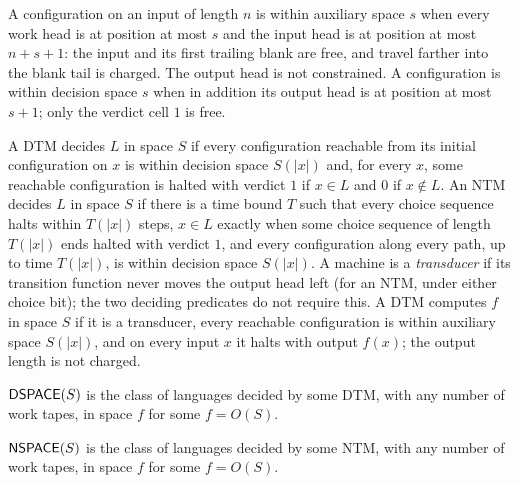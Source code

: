\begin{definition}
  \label{def:space-decides-in-space}
  \leanok
  A configuration on an input of length $n$ is within auxiliary space $s$ when
  every work head is at position at most $s$ and the input head is at position
  at most $n + s + 1$: the input and its first trailing blank are free, and
  travel farther into the blank tail is charged. The output head is not
  constrained. A configuration is within decision space $s$ when in addition
  its output head is at position at most $s + 1$; only the verdict cell $1$ is
  free.

  A DTM decides $L$ in space $S$ if every configuration reachable from its
  initial configuration on $x$ is within decision space $S(|x|)$ and, for every
  $x$, some reachable configuration is halted with verdict $1$ if $x \in L$
  and $0$ if $x \notin L$. An NTM decides $L$ in space $S$ if there is a time
  bound $T$ such that every choice sequence halts within $T(|x|)$ steps,
  $x \in L$ exactly when some choice sequence of length $T(|x|)$ ends halted
  with verdict $1$, and every configuration along every path, up to time
  $T(|x|)$, is within decision space $S(|x|)$. A machine is a
  \emph{transducer} if its transition function never moves the output head
  left (for an NTM, under either choice bit); the two deciding predicates do
  not require this. A DTM computes $f$ in space $S$ if it is a transducer,
  every reachable configuration is within auxiliary space $S(|x|)$, and on
  every input $x$ it halts with output $f(x)$; the output length is not
  charged.
\end{definition}

\begin{definition}
  \label{def:dspace}
  \leanok
  $\mathsf{DSPACE}(S)$ is the class of languages decided by some DTM, with any
  number of work tapes, in space $f$ for some $f = O(S)$.
\end{definition}

\begin{definition}
  \label{def:nspace}
  \leanok
  $\mathsf{NSPACE}(S)$ is the class of languages decided by some NTM, with any
  number of work tapes, in space $f$ for some $f = O(S)$.
\end{definition}

